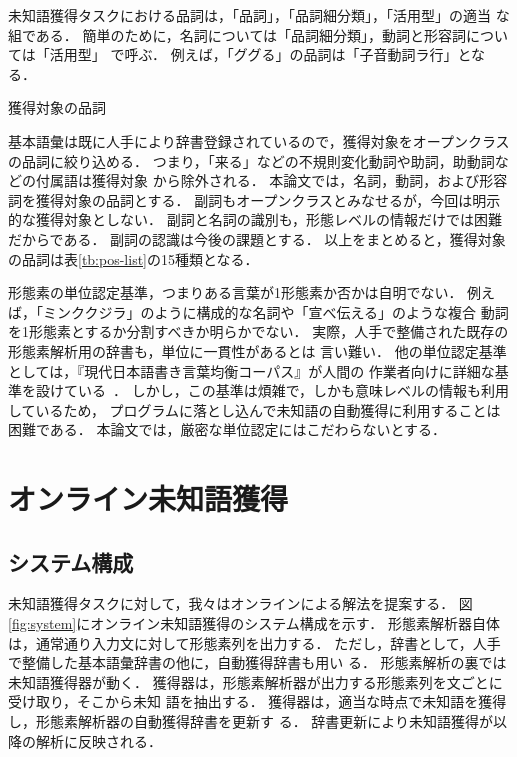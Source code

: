 \documentclass[japanese]{jnlp_1.4}
\begin{document}
未知語獲得タスクにおける品詞は，「品詞」，「品詞細分類」，「活用型」の適当
な組である．
簡単のために，名詞については「品詞細分類」，動詞と形容詞については「活用型」
で呼ぶ．
例えば，「ググる」の品詞は「子音動詞ラ行」となる．

\begin{table}[b]
\caption{獲得対象の品詞}
\label{tb:pos-list}

\vspace{-1\baselineskip}
\end{table}

基本語彙は既に人手により辞書登録されているので，獲得対象をオープンクラス
の品詞に絞り込める．
つまり，「来る」などの不規則変化動詞や助詞，助動詞などの付属語は獲得対象
から除外される．
本論文では，名詞，動詞，および形容詞を獲得対象の品詞とする．
副詞もオープンクラスとみなせるが，今回は明示的な獲得対象としない．
副詞と名詞の識別も，形態レベルの情報だけでは困難だからである．
副詞の認識は今後の課題とする．
以上をまとめると，獲得対象の品詞は表\ref{tb:pos-list}の15種類となる．


形態素の単位認定基準，つまりある言葉が1形態素か否かは自明でない．
例えば，「ミンククジラ」のように構成的な名詞や「宣べ伝える」のような複合
動詞を1形態素とするか分割すべきか明らかでない．
実際，人手で整備された既存の形態素解析用の辞書も，単位に一貫性があるとは
言い難い．
他の単位認定基準としては，『現代日本語書き言葉均衡コーパス』が人間の
作業者向けに詳細な基準を設けている~\cite{BCCWJ2008}．
しかし，この基準は煩雑で，しかも意味レベルの情報も利用しているため，
プログラムに落とし込んで未知語の自動獲得に利用することは困難である．
本論文では，厳密な単位認定にはこだわらないとする．



\section{オンライン未知語獲得} \label{sec:online-acquisition}
\subsection{システム構成} \label{sec:online-acquisition-idea}

未知語獲得タスクに対して，我々はオンラインによる解法を提案する．
図\ref{fig:system}にオンライン未知語獲得のシステム構成を示す．
形態素解析器自体は，通常通り入力文に対して形態素列を出力する．
ただし，辞書として，人手で整備した基本語彙辞書の他に，自動獲得辞書も用い
る．
形態素解析の裏では未知語獲得器が動く．
獲得器は，形態素解析器が出力する形態素列を文ごとに受け取り，そこから未知
語を抽出する．
獲得器は，適当な時点で未知語を獲得し，形態素解析器の自動獲得辞書を更新す
る．
辞書更新により未知語獲得が以降の解析に反映される．
\end{document}
